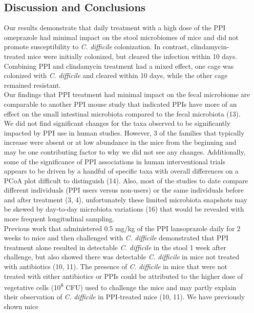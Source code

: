\documentclass[11pt,]{article}
\begin{document}
\subsection{Discussion and
Conclusions}\label{discussion-and-conclusions}

Our results demonstrate that daily treatment with a high dose of the PPI
omeprazole had minimal impact on the stool microbiomes of mice and did
not promote susceptibility to \emph{C. difficile} colonization. In
contrast, clindamycin-treated mice were initially colonized, but cleared
the infection within 10 days. Combining PPI and clindamycin treatment
had a mixed effect, one cage was colonized with \emph{C. difficile} and
cleared within 10 days, while the other cage remained resistant.\\
Our findings that PPI treatment had minimal impact on the fecal
microbiome are comparable to another PPI mouse study that indicated PPIs
have more of an effect on the small intestinal microbiota compared to
the fecal microbiota (13). We did not find significant changes for the
taxa observed to be significantly impacted by PPI use in human studies.
However, 3 of the families that typically increase were absent or at low
abundance in the mice from the beginning and may be one contributing
factor to why we did not see any changes. Additionally, some of the
significance of PPI associations in human interventional trials appears
to be driven by a handful of specific taxa with overall differences on a
PCoA plot difficult to distinguish (14). Also, most of the studies to
date compare different individuals (PPI users versus non-users) or the
same individuals before and after treatment (3, 4), unfortunately these
limited microbiota snapshots may be skewed by day-to-day microbiota
variations (16) that would be revealed with more frequent longitudinal
sampling.\\
Previous work that administered 0.5 mg/kg of the PPI lansoprazole daily
for 2 weeks to mice and then challenged with \emph{C. difficile}
demonstrated that PPI treatment alone resulted in detectable \emph{C.
difficile} in the stool 1 week after challenge, but also showed there
was detectable \emph{C. difficile} in mice not treated with antibiotics
(10, 11). The presence of \emph{C. difficile} in mice that were not
treated with either antibiotics or PPIs could be attributed to the
higher dose of vegetative cells (10\textsuperscript{8} CFU) used to
challenge the mice and may partly explain their observation of \emph{C.
difficile} in PPI-treated mice (10, 11). We have previously shown mice
\end{document}
